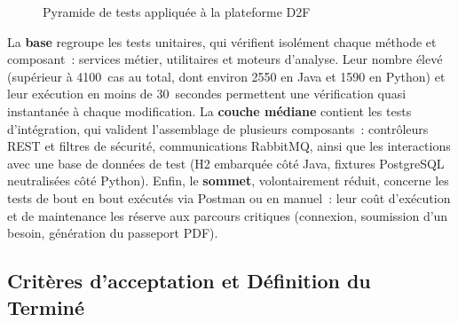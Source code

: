 \documentclass[12pt,a4paper]{report}
\begin{document}
\begin{figure}[H]
\centering
{}
\caption{Pyramide de tests appliquée à la plateforme D2F}
\label{fig:test_pyramid}
\end{figure}

La \textbf{base} regroupe les tests unitaires, qui vérifient isolément chaque
méthode et composant~: services métier, utilitaires et moteurs d'analyse. Leur
nombre élevé (supérieur à 4100~cas au total, dont environ 2550 en Java et 1590
en Python) et leur exécution en moins de 30~secondes permettent une vérification
quasi instantanée à chaque modification.
La \textbf{couche médiane} contient les tests d'intégration, qui valident
l'assemblage de plusieurs composants~: contrôleurs REST et filtres de sécurité,
communications RabbitMQ, ainsi que les interactions avec une base de données de
test (H2 embarquée côté Java, fixtures PostgreSQL neutralisées côté Python).
Enfin, le \textbf{sommet}, volontairement réduit, concerne les tests de bout
en bout exécutés via Postman ou en manuel~: leur coût d'exécution et de
maintenance les réserve aux parcours critiques (connexion, soumission d'un
besoin, génération du passeport PDF).

\subsection{Critères d'acceptation et Définition du Terminé}
\end{document}
